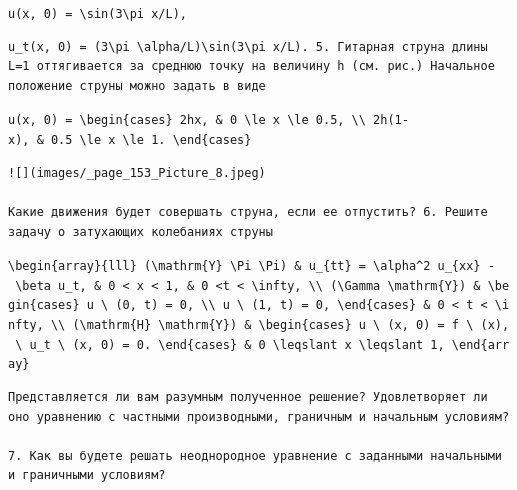 \documentclass[
  ukrainian,
]{article}
\begin{document}
\texttt{u(x,\ 0)\ =\ \textbackslash{}sin(3\textbackslash{}pi\ x/L),}

\begin{verbatim}
u_t(x, 0) = (3\pi \alpha/L)\sin(3\pi x/L). 5. Гитарная струна длины L=1 оттягивается за среднюю точку на величину h (см. рис.) Начальное положение струны можно задать в виде
\end{verbatim}

\texttt{u(x,\ 0)\ =\ \textbackslash{}begin\{cases\}\ 2hx,\ \&\ 0\ \textbackslash{}le\ x\ \textbackslash{}le\ 0.5,\ \textbackslash{}\textbackslash{}\ 2h(1-x),\ \&\ 0.5\ \textbackslash{}le\ x\ \textbackslash{}le\ 1.\ \textbackslash{}end\{cases\}}

\begin{verbatim}
![](images/_page_153_Picture_8.jpeg)

Какие движения будет совершать струна, если ее отпустить? 6. Решите задачу о затухающих колебаниях струны
\end{verbatim}

\texttt{\textbackslash{}begin\{array\}\{lll\}\ (\textbackslash{}mathrm\{Y\}\ \textbackslash{}Pi\ \textbackslash{}Pi)\ \&\ u\_\{tt\}\ =\ \textbackslash{}alpha\^{}2\ u\_\{xx\}\ -\ \textbackslash{}beta\ u\_t,\ \&\ 0\ \textless{}\ x\ \textless{}\ 1,\ \&\ 0\ \textless{}t\ \textless{}\ \textbackslash{}infty,\ \textbackslash{}\textbackslash{}\ (\textbackslash{}Gamma\ \textbackslash{}mathrm\{Y\})\ \&\ \textbackslash{}begin\{cases\}\ u\ \textbackslash{}\ (0,\ t)\ =\ 0,\ \textbackslash{}\textbackslash{}\ u\ \textbackslash{}\ (1,\ t)\ =\ 0,\ \textbackslash{}end\{cases\}\ \&\ 0\ \textless{}\ t\ \textless{}\ \textbackslash{}infty,\ \textbackslash{}\textbackslash{}\ (\textbackslash{}mathrm\{H\}\ \textbackslash{}mathrm\{Y\})\ \&\ \textbackslash{}begin\{cases\}\ u\ \textbackslash{}\ (x,\ 0)\ =\ f\ \textbackslash{}\ (x),\ \textbackslash{}\ u\_t\ \textbackslash{}\ (x,\ 0)\ =\ 0.\ \textbackslash{}end\{cases\}\ \&\ 0\ \textbackslash{}leqslant\ x\ \textbackslash{}leqslant\ 1,\ \textbackslash{}end\{array\}}

\begin{verbatim}
Представляется ли вам разумным полученное решение? Удовлетворяет ли оно уравнению с частными производными, граничным и начальным условиям?

7. Как вы будете решать неоднородное уравнение с заданными начальными и граничными условиям?
\end{verbatim}
\end{document}
